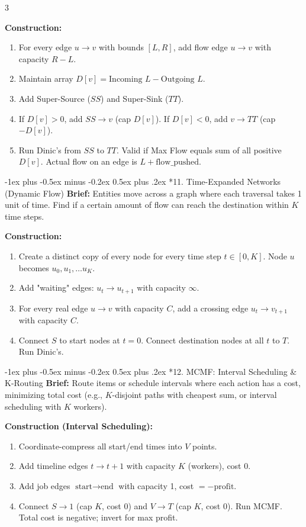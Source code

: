 \documentclass[8pt,a4paper,onesided]{article}
\makeatletter
\renewcommand{\subsection}{\@startsection{subsection}{2}{0mm}
    {-1ex plus -0.5ex minus -0.2ex} %
    {0.5ex plus .2ex}                %
    {\normalfont\large\bfseries}}    %
\makeatother
\begin{document}
\begin{multicols}{3}
{\textbf{Construction:}
\begin{enumerate}
    \item For every edge $u \to v$ with bounds $[L, R]$, add flow edge $u \to v$ with capacity $R - L$.
    \item Maintain array $D[v] = \text{Incoming } L - \text{Outgoing } L$.
    \item Add Super-Source ($SS$) and Super-Sink ($TT$). 
    \item If $D[v] > 0$, add $SS \to v$ (cap $D[v]$). If $D[v] < 0$, add $v \to TT$ (cap $-D[v]$).
    \item Run Dinic's from $SS$ to $TT$. Valid if Max Flow equals sum of all positive $D[v]$. Actual flow on an edge is $L + \text{flow\_pushed}$.
\end{enumerate}


\subsection*{11. Time-Expanded Networks (Dynamic Flow)}
\textbf{Brief:} Entities move across a graph where each traversal takes 1 unit of time. Find if a certain amount of flow can reach the destination within $K$ time steps.

\textbf{Construction:}
\begin{enumerate}
    \item Create a distinct copy of every node for every time step $t \in [0, K]$. Node $u$ becomes $u_0, u_1, \dots u_K$.
    \item Add "waiting" edges: $u_t \to u_{t+1}$ with capacity $\infty$.
    \item For every real edge $u \to v$ with capacity $C$, add a crossing edge $u_t \to v_{t+1}$ with capacity $C$.
    \item Connect $S$ to start nodes at $t=0$. Connect destination nodes at all $t$ to $T$. Run Dinic's.
\end{enumerate}


\subsection*{12. MCMF: Interval Scheduling \& K-Routing}
\textbf{Brief:} Route items or schedule intervals where each action has a cost, minimizing total cost (e.g., $K$-disjoint paths with cheapest sum, or interval scheduling with $K$ workers).

\textbf{Construction (Interval Scheduling):}
\begin{enumerate}
    \item Coordinate-compress all start/end times into $V$ points. 
    \item Add timeline edges $t \to t+1$ with capacity $K$ (workers), cost $0$.
    \item Add job edges $\text{start} \to \text{end}$ with capacity 1, cost $= -\text{profit}$.
    \item Connect $S \to 1$ (cap $K$, cost $0$) and $V \to T$ (cap $K$, cost $0$). Run MCMF. Total cost is negative; invert for max profit.
\end{enumerate}


}
\end{multicols}
\end{document}
